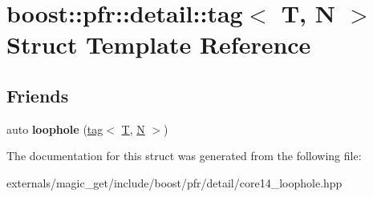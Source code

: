 \hypertarget{structboost_1_1pfr_1_1detail_1_1tag}{}\section{boost\+:\+:pfr\+:\+:detail\+:\+:tag$<$ T, N $>$ Struct Template Reference}
\label{structboost_1_1pfr_1_1detail_1_1tag}
\subsection*{Friends}
\begin{DoxyCompactItemize}
\item 
\mbox{\label{structboost_1_1pfr_1_1detail_1_1tag_a96100314a4c088d676b7a5c48e603a2f}} 
auto {\bfseries loophole} (\mbox{\hyperlink{structboost_1_1pfr_1_1detail_1_1tag}{tag}}$<$ \mbox{\hyperlink{struct_t}{T}}, \mbox{\hyperlink{group__types_gaf9c1edb0e0da55ec6ba09f32f6839529}{N}} $>$)
\end{DoxyCompactItemize}


The documentation for this struct was generated from the following file\+:\begin{DoxyCompactItemize}
\item 
externals/magic\+\_\+get/include/boost/pfr/detail/core14\+\_\+loophole.\+hpp\end{DoxyCompactItemize}
